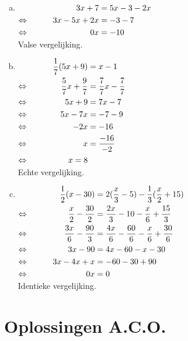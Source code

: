 \documentclass[12pt]{article}
\begin{document}
\begin{solution}
\vspace{-2\topsep}
\begin{enumerate}[(a)]
\item $\begin{aligned}[t]
     && 3x + 7 &= 5x - 3 - 2x\\
\Leftrightarrow\mkern40mu && 3x - 5x + 2x	&= - 3 - 7\\
\Leftrightarrow\mkern40mu && 0x	&= - 10 \\
\end{aligned}$\\
Valse vergelijking.
\item $\begin{aligned}[t]
     && \dfrac{1}{7}(5x+9) &= x - 1\\
\Leftrightarrow\mkern40mu && \dfrac{5}{7}x+\dfrac{9}{7} &= \dfrac{7}{7}x-\dfrac{7}{7}\\
\Leftrightarrow\mkern40mu && 5x + 9	&= 7x - 7\\
\Leftrightarrow\mkern40mu && 5x - 7x	&= - 7 - 9\\
\Leftrightarrow\mkern40mu && - 2x	&= - 16\\
\Leftrightarrow\mkern40mu && x	&= \dfrac{-16}{-2}\\
\Leftrightarrow\mkern40mu && x	= 8\\
\end{aligned}$\\
Echte vergelijking.
\item $\begin{aligned}[t]
     && \dfrac{1}{2}(x-30)&=2(\dfrac{x}{3}-5)-\dfrac{1}{3}(\dfrac{x}{2}+15)\\
\Leftrightarrow\mkern40mu && \dfrac{x}{2}-\dfrac{30}{2}&=\dfrac{2x}{3}-10-\dfrac{x}{6}+\dfrac{15}{3}\\
\Leftrightarrow\mkern40mu && \dfrac{3x}{6}-\dfrac{90}{3}&=\dfrac{4x}{6}-\dfrac{60}{6}-\dfrac{x}{6}+\dfrac{30}{6}\\
\Leftrightarrow\mkern40mu && 3x - 90	&= 4x - 60 - x - 30\\
\Leftrightarrow\mkern40mu && 3x - 4x + x	&= - 60 - 30 + 90\\
\Leftrightarrow\mkern40mu && 0x	&= 0\\
\end{aligned}$\\
Identieke vergelijking.
\end{enumerate}
\end{solution}

\newpage
\section*{Oplossingen A.C.O.}

\immediate\closeout\solutionstream

\end{document}

